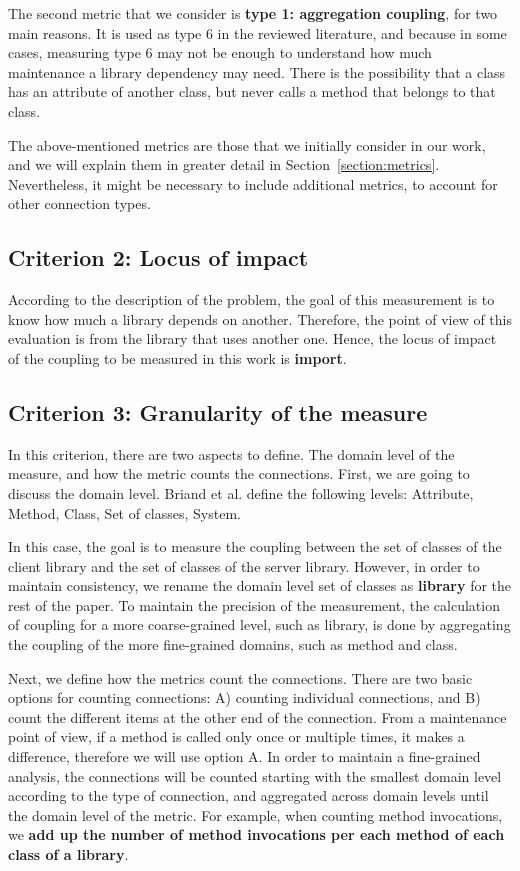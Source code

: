 \documentclass[a4paper]{article}
\begin{document}
The second metric that we consider is \textbf{type 1: aggregation coupling}, for two main reasons. It is used as type 6 in the reviewed literature, and because in some cases, measuring type 6 may not be enough to understand how much maintenance a library dependency may need. There is the possibility that a class has an attribute of another class, but never calls a method that belongs to that class.

The above-mentioned metrics are those that we initially consider in our work, and we will explain them in greater detail in Section~\ref{section:metrics}. Nevertheless, it might be necessary to include additional metrics, %
to account for other connection types.

\subsection{Criterion 2: Locus of impact}
According to the description of the problem, the goal of this measurement is to know how much a library depends on another. Therefore, the point of view of this evaluation is from the library that uses another one. Hence, the locus of impact of the coupling to be measured in this work is \textbf{import}.

\subsection{Criterion 3: Granularity of the measure}
In this criterion, there are two aspects to define. The domain level of the measure, and how the metric counts the connections.
First, we are going to discuss the domain level. Briand et al. define the following levels: Attribute, Method, Class, Set of classes, System.

In this case, the goal is to measure the coupling between the set of classes of the client library and the set of classes of the server library. However, in order to maintain consistency, we rename the domain level set of classes as \textbf{library} for the rest of the paper. To maintain the precision of the measurement, the calculation of coupling for a more coarse-grained level, such as library, is done by aggregating the coupling of the more fine-grained domains, such as method and class.

Next, we define how the metrics count the connections. There are two basic options for counting connections: A) counting individual connections, and B) count the different items at the other end of the connection. From a maintenance point of view, if a method is called only once or multiple times, it makes a difference, therefore we will use option A. In order to maintain a fine-grained analysis, the connections will be counted starting with the smallest domain level according to the type of connection, and aggregated across domain levels until the domain level of the metric. For example, when counting method invocations, we  \textbf{add up the number of method invocations per each method of each class of a library}.
\end{document}

